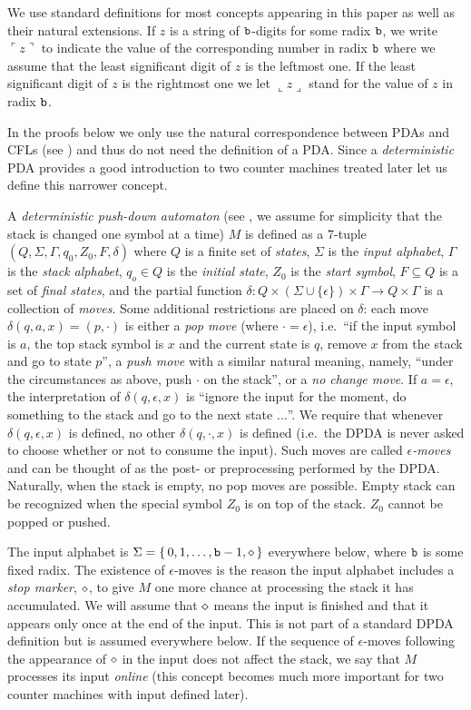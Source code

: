 \documentclass[12pt]{article}
\begin{document}
We use standard definitions for most concepts appearing in this paper
as well as their natural extensions. If
$z$ is a string of ${\tt b}$-digits for some radix ${\tt b}$, we write
$\ulcorner z\urcorner$ to indicate the value of the corresponding
number in radix ${\tt b}$ where we assume that the least significant
digit of $z$ is the leftmost one. If the least significant digit of $z$
is the rightmost one we let $\llcorner z\lrcorner$ stand for the value
of $z$ in radix ${\tt b}$.

In the proofs below we only use the natural correspondence between
PDAs and CFLs (see \cite{hum}) and thus do not need the definition of
a PDA. Since  a {\it deterministic\/} PDA provides a good introduction
to two counter machines treated later let us define this narrower
concept.

A {\it deterministic push-down automaton\/} (see \cite{hum}, we assume
for simplicity that the stack is changed one symbol at a time) $M$ is defined as a 7-tuple $(Q, \Sigma,
\Gamma, q_0, Z_0, F, \delta)$ where $Q$ is a finite set of
{\it states}, $\Sigma$ is the {\it input alphabet}, $\Gamma$ is the {\it stack alphabet},
$q_o\in Q$ is the {\it initial state}, $Z_0$ is the {\it start
  symbol\/}, $F\subseteq Q$ is a set of {\it final states\/}, and the
partial function
$\delta:Q\times(\Sigma\cup\{\epsilon\})\times\Gamma\to Q\times\Gamma$
is a collection of {\it moves\/}. Some additional restrictions are
placed on $\delta$: each move $\delta(q,a,x)=(p,\cdot)$ is either a {\it pop
  move\/} (where $\cdot=\epsilon$), i.e.~``if the input symbol is $a$, the top stack symbol is
$x$ and the current state is $q$, remove $x$ from the stack and go to
state $p$'', a {\it
  push move\/} with a similar natural meaning, namely, ``under
the circumstances as above, push $\cdot$ on the stack'', or a {\it no change
  move\/}. If $a=\epsilon$, the interpretation of
$\delta(q,\epsilon,x)$ is ``ignore the input for the moment, do
something to the stack and go to
the next state $\ldots$''. We require that whenever $\delta(q,\epsilon,x)$ is
defined, no other $\delta(q,\cdot,x)$ is defined (i.e.~the DPDA is
never asked to choose whether or not to consume the input). Such moves
are called {\it $\epsilon$-moves\/}
and can be thought of as the post- or preprocessing performed by the
DPDA. Naturally, when the stack is empty, no pop moves are
possible. Empty stack can be recognized when the special symbol $Z_0$
is on top of the stack. $Z_0$ cannot be popped or pushed.

The input alphabet is $\Sigma=\{\,0,1,\ldots,{\tt b}-1,\diamond\,\}$
everywhere below, where ${\tt b}$ is some fixed radix.
The existence of $\epsilon$-moves is the reason the input alphabet
includes a {\it stop
  marker\/}, $\diamond$, to give $M$ one more chance at processing the
stack it has accumulated. We will assume that $\diamond$ means the input
is finished and that it appears only once at the end of the input. This
is not part of a standard DPDA definition but is assumed everywhere
below. If the sequence of $\epsilon$-moves following
the appearance of $\diamond$ in the input does not affect the stack, we
say that $M$ processes its input {\it online} (this concept becomes
much more important for two counter machines with input defined later).
\end{document}
